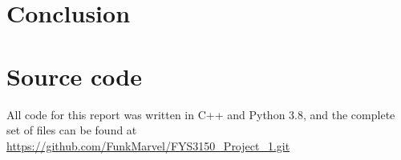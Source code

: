 \documentclass[english,notitlepage,preprint]{revtex4-1}  %
\begin{document}
\section{Conclusion} \label{sec:V}

\appendix
\section{Source code}
All code for this report was written in C++ and Python 3.8, and the complete set of files can be found at \url{https://github.com/FunkMarvel/FYS3150_Project_1.git}
\end{document}
